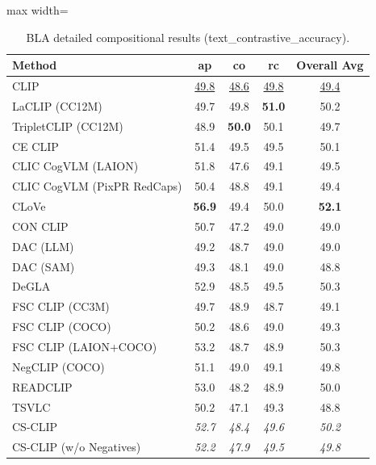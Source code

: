 \begin{table}[t]
  \centering
  \scriptsize
  \caption{BLA detailed compositional results (text_contrastive_accuracy).}
  \label{tab:BLA_detailed}
  \begin{adjustbox}{max width=\textwidth}
  \setlength{\tabcolsep}{2pt}
  \begin{tabular}{p{5cm}c|c|c|c}
    \toprule
    Method & ap & co & rc & Overall Avg \\
    \midrule
    CLIP & \underline{49.8} & \underline{48.6} & \underline{49.8} & \underline{49.4} \\
    \midrule
    LaCLIP (CC12M) & 49.7 & 49.8 & \textbf{51.0} & 50.2 \\
    TripletCLIP (CC12M) & 48.9 & \textbf{50.0} & 50.1 & 49.7 \\
    \midrule
    CE CLIP & 51.4 & 49.5 & 49.5 & 50.1 \\
    CLIC CogVLM (LAION) & 51.8 & 47.6 & 49.1 & 49.5 \\
    CLIC CogVLM (PixPR RedCaps) & 50.4 & 48.8 & 49.1 & 49.4 \\
    CLoVe & \textbf{56.9} & 49.4 & 50.0 & \textbf{52.1} \\
    CON CLIP & 50.7 & 47.2 & 49.0 & 49.0 \\
    DAC (LLM) & 49.2 & 48.7 & 49.0 & 49.0 \\
    DAC (SAM) & 49.3 & 48.1 & 49.0 & 48.8 \\
    DeGLA & 52.9 & 48.5 & 49.5 & 50.3 \\
    FSC CLIP (CC3M) & 49.7 & 48.9 & 48.7 & 49.1 \\
    FSC CLIP (COCO) & 50.2 & 48.6 & 49.0 & 49.3 \\
    FSC CLIP (LAION+COCO) & 53.2 & 48.7 & 48.9 & 50.3 \\
    NegCLIP (COCO) & 51.1 & 49.0 & 49.1 & 49.8 \\
    READCLIP & 53.0 & 48.2 & 48.9 & 50.0 \\
    TSVLC & 50.2 & 47.1 & 49.3 & 48.8 \\
    \midrule
    CS-CLIP & \emph{52.7} & \emph{48.4} & \emph{49.6} & \emph{50.2} \\
    CS-CLIP (w/o Negatives) & \emph{52.2} & \emph{47.9} & \emph{49.5} & \emph{49.8} \\
    \bottomrule
  \end{tabular}
  \end{adjustbox}
\end{table}